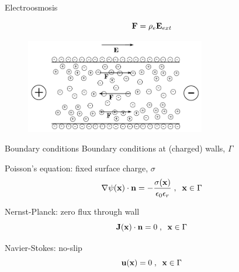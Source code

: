 \begin{frame}{Electroosmosis}

\begin{equation}
\mathbf{F} = \mathrm{\rho}_e \mathbf{E}_{ext}
\end{equation}

\begin{figure}
\begin{center}
\includegraphics[width=0.7\textwidth]{../fig/channel_electroosmosis.pdf}
\end{center}
\end{figure}

\end{frame}

\begin{frame}{Boundary conditions}
Boundary conditions at (charged) walls, $\Gamma$

\begin{itemize*}
\item Poisson's equation: fixed surface charge, $\sigma$
\begin{equation}\label{eq:et:fix_c}
\nabla\psirm(\x) \cdot \n =
-\frac{\sigma(\x)}{\epsilon_0\epsilon_r}\;,\;\; \x \in \Gamma
\end{equation}

\item Nernst-Planck: zero flux through wall
\begin{equation}\label{eq:et:j0}
\J(\x) \cdot \mathbf{n} = 0 \;,\;\; \x \in \Gamma
\end{equation}

\item Navier-Stokes: no-slip
\begin{equation}
\mathbf{u}(\mathbf{x}) = 0 \;,\;\; \mathbf{x} \in \Gamma
\end{equation} 

\end{itemize*}
\end{frame}
